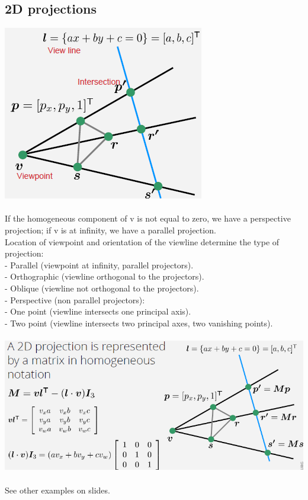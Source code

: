 \documentclass{article}
\begin{document}
\subsection{2D projections}
\includegraphics[scale=0.6]{image36.png}\\\\
If the homogeneous component of v is not equal to zero, we have a perspective projection; if v is at infinity, we have a parallel projection.\\
Location of viewpoint and orientation of the viewline determine the type of projection:\\
- Parallel (viewpoint at infinity, parallel projectors).\\
	- Orthographic (viewline orthogonal to the projectors).\\
	- Oblique (viewline not orthogonal to the projectors).\\
- Perspective (non parallel projectors):\\
	- One point (viewline intersects one principal axis).\\
	- Two point (viewline intersects two principal axes, two vanishing points).\\\\
\includegraphics[scale=0.6]{image37.png}\\\\
See other examples on slides.\\\\
\end{document}
